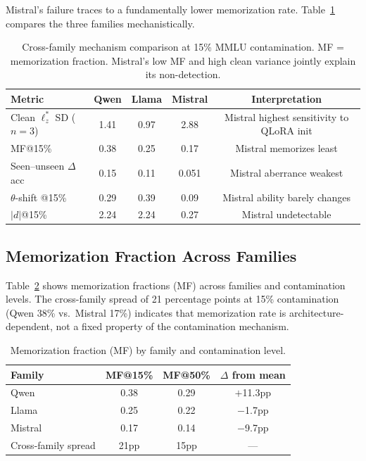 \documentclass[11pt,a4paper]{article}
\begin{document}
Mistral's failure traces to a fundamentally lower memorization rate.
Table~\ref{tab:mechanism-comparison} compares the three families mechanistically.

\begin{table}[t]
\centering
\caption{Cross-family mechanism comparison at 15\% MMLU contamination. MF = memorization fraction. Mistral's low MF and high clean variance jointly explain its non-detection.}
\label{tab:mechanism-comparison}
\small
\begin{tabular}{lcccc}
\toprule
\textbf{Metric} & \textbf{Qwen} & \textbf{Llama} & \textbf{Mistral} & \textbf{Interpretation} \\
\midrule
Clean $\ell_z^{*}$ SD ($n{=}3$) & 1.41 & 0.97 & 2.88 & Mistral highest sensitivity to QLoRA init \\
MF@15\%                         & 0.38 & 0.25 & 0.17 & Mistral memorizes least \\
Seen--unseen $\Delta$acc        & 0.15 & 0.11 & 0.051 & Mistral aberrance weakest \\
$\theta$-shift @15\%            & 0.29 & 0.39 & 0.09 & Mistral ability barely changes \\
$|d|$@15\%                      & 2.24 & 2.24 & 0.27 & Mistral undetectable \\
\bottomrule
\end{tabular}
\end{table}

\subsection{Memorization Fraction Across Families}

Table~\ref{tab:memorization-fraction} shows memorization fractions (MF) across families and contamination levels.
The cross-family spread of 21 percentage points at 15\% contamination (Qwen 38\% vs.\ Mistral 17\%) indicates that memorization rate is architecture-dependent, not a fixed property of the contamination mechanism.

\begin{table}[t]
\centering
\caption{Memorization fraction (MF) by family and contamination level.}
\label{tab:memorization-fraction}
\small
\begin{tabular}{lccc}
\toprule
\textbf{Family} & \textbf{MF@15\%} & \textbf{MF@50\%} & \textbf{$\Delta$ from mean} \\
\midrule
Qwen    & 0.38 & 0.29 & $+$11.3pp \\
Llama   & 0.25 & 0.22 & $-$1.7pp \\
Mistral & 0.17 & 0.14 & $-$9.7pp \\
\midrule
Cross-family spread & 21pp & 15pp & --- \\
\bottomrule
\end{tabular}
\end{table}
\end{document}
